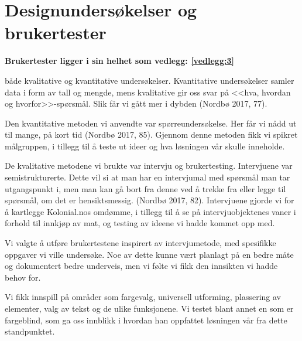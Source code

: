 \chapter{\textbf{Designundersøkelser og brukertester}}
\textbf{Brukertester ligger i sin helhet som vedlegg: \ref{vedlegg:3}}

 både kvalitative og kvantitative undersøkelser. Kvantitative undersøkelser samler data i form av tall og mengde, mens kvalitative gir oss svar på <<hva, hvordan og hvorfor>>-spørsmål. Slik får vi gått mer i dybden (Nordbø 2017, 77\nocite{nordbo:interaksjonsdesign}). 

Den kvantitative metoden vi anvendte var spørreundersøkelse. Her får vi nådd ut til mange, på kort tid (Nordbø 2017, 85\nocite{nordbo:interaksjonsdesign}). Gjennom denne metoden fikk vi spikret målgruppen, i tillegg til å teste ut ideer og hva løsningen vår skulle inneholde. 

De kvalitative metodene vi brukte var intervju og brukertesting. Intervjuene var semistrukturerte. Dette vil si at man har en intervjumal med spørsmål man tar utgangspunkt i, men man kan gå bort fra denne ved å trekke fra eller legge til spørsmål, om det er hensiktsmessig. (Nordbø 2017, 82\nocite{nordbo:interaksjonsdesign}). Intervjuene gjorde vi for å kartlegge Kolonial.nos omdømme, i tillegg til å se på intervjuobjektenes vaner i forhold til innkjøp av mat, og testing av ideene vi hadde kommet opp med.  

Vi valgte å utføre brukertestene inspirert av intervjumetode, med spesifikke oppgaver vi ville undersøke. Noe av dette kunne vært planlagt på en bedre måte og dokumentert bedre underveis, men vi følte vi fikk den innsikten vi hadde behov for. 

Vi fikk innspill på områder som fargevalg, universell utforming, plassering av elementer, valg av tekst og de ulike funksjonene. Vi testet blant annet en som er fargeblind, som ga oss innblikk i hvordan han oppfattet løsningen vår fra dette standpunktet. 